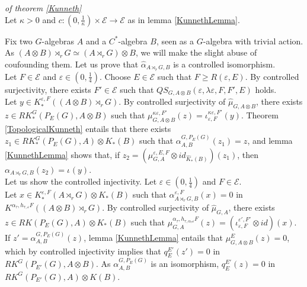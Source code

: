 \begin{dem} \textit{of theorem \ref{Kunneth}}\\
Let $\kappa>0$ and $c : (0,\frac{1}{\kappa})\times\mathcal E\rightarrow \mathcal E$ as in lemma \ref{KunnethLemma}.

Fix two $G$-algebras $A$ and a $C^*$-algebra $B$, seen as a $G$-algebra with trivial action. As $(A\otimes B)\rtimes_r G \simeq (A\rtimes_r G)\otimes B$, we will make the slight abuse of coufounding them. Let us prove that $\hat \alpha_{A\rtimes_r G,B}$ is a controlled isomorphism.\\

Let $F\in\mathcal E$ and $\varepsilon\in (0,\frac{1}{4})$. Choose $E \in\mathcal E$ such that $F\geq R(\varepsilon,E)$. By controlled surjectivity, there exists $F'\in \mathcal E$ such that $QS_{G,A\otimes B}(\varepsilon,\lambda\varepsilon, F,F',E)$ holds.\\

Let $y\in K^{\varepsilon,F}_*((A\otimes B)\rtimes_r G)$. By controlled surjectivity of $\hat\mu_{G,A\otimes B}$, there exists $z\in RK_*^G(P_E(G), A\otimes B) $ such that $\mu_{G,A\otimes B}^{\kappa\varepsilon,F'}(z)=\iota_{\varepsilon,F}^{\kappa\varepsilon,F'}(y)$. Theorem \ref{TopologicalKunneth} entails that there exists $z_1 \in RK_*^G(P_E(G),A)\otimes K_*(B) $ such that $\alpha_{A,B}^{G,P_E(G)}(z_1)=z$, and lemma \ref{KunnethLemma} shows that, if $z_2=(\mu_{G,A}^{\varepsilon,E,F} \otimes id_{\hat K_*(B)})(z_1)$, then $\alpha_{A\rtimes_r G,B}(z_2)=\iota_{}^{}(y)$.\\

Let us show the controlled injectivity. Let $\varepsilon\in(0,\frac{1}{4})$ and $F\in\mathcal E$.\\ 

Let $x\in K^{\varepsilon,F}_*(A\rtimes_r G)\otimes K_*(B)$ such that $\alpha_{A\rtimes_r G,B}^{\varepsilon,F}(x)=0$ in $K^{\alpha_\tau,h_{\tau,\varepsilon} F}((A\otimes B)\rtimes_r G)$. By controlled surjectivity of $\hat\mu_{G,A}$, there exists $z\in RK(P_E(G),A)\otimes K_*(B)$ such that $\mu_{G,A}^{\alpha_\tau,h_{\tau,\alpha_\tau\varepsilon} F}(z)=(\iota_{\varepsilon,F}^{\varepsilon',F'}\otimes id) (x)$. If $z' = \alpha_{A,B}^{G,P_E(G)}(z)$, lemma \ref{KunnethLemma} entails that $\mu^{E}_{G,A\otimes B}(z)=0$, which by controlled injectivity implies that $q_E^{E'}(z')=0$ in $RK^G(P_{E'}(G),A\otimes B)$. As $\alpha_{A,B}^{G,P_E(G)}$ is an isomorphism, $q_E^{E'}(z)=0$ in $RK^G(P_{E'}(G),A)\otimes K(B)$.

\end{dem}




























